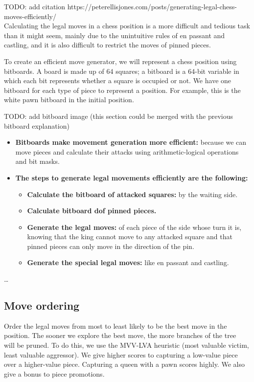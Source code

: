 TODO: add citation https://peterellisjones.com/posts/generating-legal-chess-moves-efficiently/ \\

Calculating the legal moves in a chess position is a more difficult and tedious task than it might seem, mainly due to the unintuitive rules of en passant and castling, and it is also difficult to restrict the moves of pinned pieces.

To create an efficient move generator, we will represent a chess position using bitboards. A board is made up of 64 squares; a bitboard is a 64-bit variable in which each bit represents whether a square is occupied or not. We have one bitboard for each type of piece to represent a position. For example, this is the white pawn bitboard in the initial position.

TODO: add bitboard image (this section could be merged with the previous bitboard explanation) \\

\begin{itemize}
    \item \textbf{Bitboards make movement generation more efficient:} because we can move pieces and calculate their attacks using arithmetic-logical operations and bit masks.

    \item \textbf{The steps to generate legal movements efficiently are the following:}
    \begin{itemize}
        \item \textbf{Calculate the bitboard of attacked squares:} by the waiting side.
        \item \textbf{Calculate bitboard dof pinned pieces.}
        \item \textbf{Generate the legal moves:} of each piece of the side whose turn it is, knowing that the king cannot move to any attacked square and that pinned pieces can only move in the direction of the pin.
        \item \textbf{Generate the special legal moves:} like en passant and castling.
    \end{itemize}
\end{itemize}
  

\ldots

\subsection{Move ordering}

Order the legal moves from most to least likely to be the best move in the\\
position. The sooner we explore the best move, the more branches of the tree\\
will be pruned. To do this, we use the MVV-LVA heuristic (most valuable victim,\\
least valuable aggressor). We give higher scores to capturing a low-value piece\\
over a higher-value piece. Capturing a queen with a pawn scores highly. We also\\
give a bonus to piece promotions.\\

